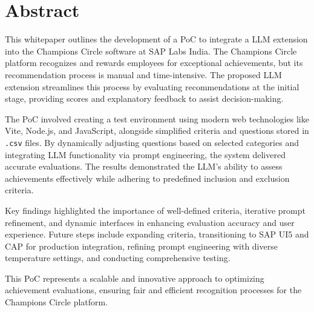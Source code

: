 \section*{Abstract}

This whitepaper outlines the development of a \ac{PoC} to integrate a \ac{LLM} extension into the Champions Circle software at SAP Labs India. 
The Champions Circle platform recognizes and rewards employees for exceptional achievements, but its recommendation process is manual and time-intensive. 
The proposed \ac{LLM} extension streamlines this process by evaluating recommendations at the initial stage, providing scores and explanatory feedback to assist decision-making.
    
The \ac{PoC} involved creating a test environment using modern web technologies like Vite, Node.js, and JavaScript, alongside simplified criteria and questions stored in \texttt{.csv} files. 
By dynamically adjusting questions based on selected categories and integrating \ac{LLM} functionality via prompt engineering, the system delivered accurate evaluations. 
The results demonstrated the \ac{LLM}'s ability to assess achievements effectively while adhering to predefined inclusion and exclusion criteria.
    
Key findings highlighted the importance of well-defined criteria, iterative prompt refinement, and dynamic interfaces in enhancing evaluation accuracy and user experience. 
Future steps include expanding criteria, transitioning to SAP UI5 and CAP for production integration, refining prompt engineering with diverse temperature settings, and conducting comprehensive testing.
    
This \ac{PoC} represents a scalable and innovative approach to optimizing achievement evaluations, ensuring fair and efficient recognition processes for the Champions Circle platform.
    